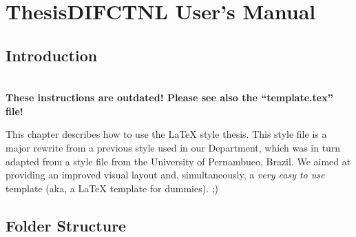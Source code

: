 % 
%  
%
\chapter{ThesisDIFCTNL User's Manual}
\label{cha:users_manual}

\section{Introduction} %
\label{sec:introduction}

{\LARGE \textbf{~\\These instructions are outdated! Please see also the “template.tex” file!\\}}

This chapter describes how to use the \LaTeX{} style thesis{}. This style file is a major rewrite from a previous style used in our Department, which was in turn adapted from a style file from the University of Pernambuco, Brazil.  We aimed at providing an improved visual layout and, simultaneously, a \emph{very easy to use} template (aka, a \LaTeX{} template for dummies). ;)

\noindent%

\section{Folder Structure} %
\label{sec:folder_structure}

